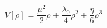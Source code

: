 \begin{equation}
V[\rho] = \frac {\mu^2}{2} \rho + \frac{\lambda_0} {4} \rho^2 + \frac{\eta}{6} \rho^3
\end{equation}

